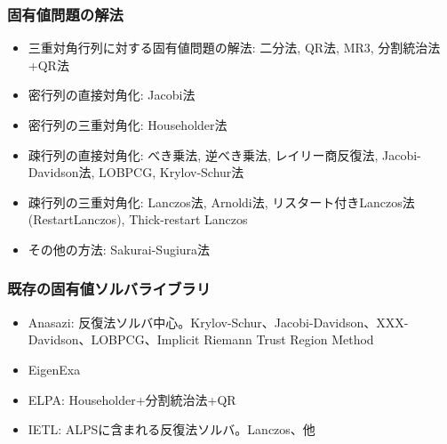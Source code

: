 \begin{frame}
  \frametitle{固有値問題の解法}
  \begin{itemize}
    \setlength{\itemsep}{1em}
  \item 三重対角行列に対する固有値問題の解法: 二分法, QR法, MR3, 分割統治法+QR法
  \item 密行列の直接対角化: Jacobi法
  \item 密行列の三重対角化: Householder法
  \item 疎行列の直接対角化: べき乗法, 逆べき乗法, レイリー商反復法, Jacobi-Davidson法, LOBPCG, Krylov-Schur法
  \item 疎行列の三重対角化: Lanczos法, Arnoldi法, リスタート付きLanczos法(RestartLanczos), Thick-restart Lanczos
  \item その他の方法: Sakurai-Sugiura法
  \end{itemize}
\end{frame}

\begin{frame}
  \frametitle{既存の固有値ソルバライブラリ}
  \begin{itemize}
  \item Anasazi: 反復法ソルバ中心。Krylov-Schur、Jacobi-Davidson、XXX-Davidson、LOBPCG、Implicit Riemann Trust Region Method
  \item EigenExa
  \item ELPA: Householder+分割統治法+QR
  \item IETL: ALPSに含まれる反復法ソルバ。Lanczos、他
  \end{itemize}
\end{frame}

